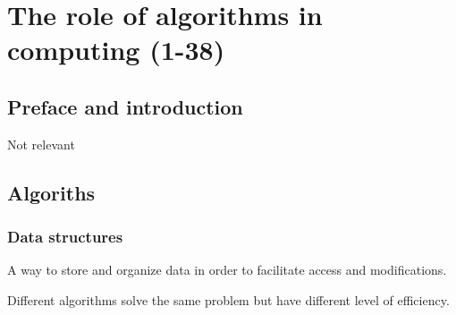 \chapter{The role of algorithms in computing (1-38)}



\section{Preface and introduction}
Not relevant


\section{Algoriths}
\subsection{Data structures}

\begin{definition}\label{def:data_structure_1}
    A way to store and organize data in order to facilitate access and modifications.
\end{definition}

\begin{definition}[Efficiency]\label{def:efficiency_1}
    Different algorithms solve the same problem but have different level of efficiency.
    
\end{definition}

